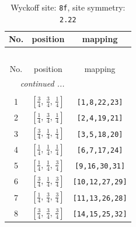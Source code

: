 \documentclass[fleqn,8pt]{jsarticle}
\begin{document}
\begin{longtable}{ccc}
\caption{Wyckoff site: {\tt 8f}, site symmetry: {\tt 2.22}}
 \\
 \hline \hline
No. & position & mapping \\ \hline \endfirsthead

\multicolumn{2}{l}{\tablename\ \thetable{}} \\
 \hline \hline
No. & position & mapping \\ \hline \endhead

 \hline \hline
\multicolumn{2}{r}{\footnotesize\it continued ...} \\ \endfoot

 \hline \hline
\multicolumn{2}{r}{} \\ \endlastfoot

1 & $\left[ \frac{3}{4},\, \frac{3}{4},\, \frac{1}{4} \right]$ & {\tt [1,8,22,23]} \\ \hline
2 & $\left[ \frac{1}{4},\, \frac{3}{4},\, \frac{1}{4} \right]$ & {\tt [2,4,19,21]} \\ \hline
3 & $\left[ \frac{3}{4},\, \frac{1}{4},\, \frac{1}{4} \right]$ & {\tt [3,5,18,20]} \\ \hline
4 & $\left[ \frac{1}{4},\, \frac{1}{4},\, \frac{1}{4} \right]$ & {\tt [6,7,17,24]} \\ \hline
5 & $\left[ \frac{1}{4},\, \frac{1}{4},\, \frac{3}{4} \right]$ & {\tt [9,16,30,31]} \\ \hline
6 & $\left[ \frac{3}{4},\, \frac{1}{4},\, \frac{3}{4} \right]$ & {\tt [10,12,27,29]} \\ \hline
7 & $\left[ \frac{1}{4},\, \frac{3}{4},\, \frac{3}{4} \right]$ & {\tt [11,13,26,28]} \\ \hline
8 & $\left[ \frac{3}{4},\, \frac{3}{4},\, \frac{3}{4} \right]$ & {\tt [14,15,25,32]} \\
\end{longtable}
\renewcommand{\arraystretch}{1.2}
\end{document}
